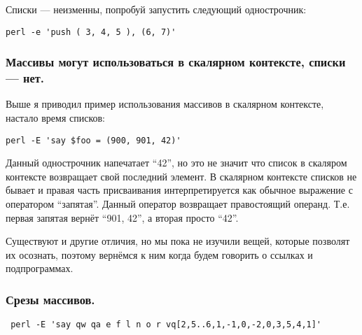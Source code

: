 Списки --- неизменны, попробуй запустить следующий однострочник:
\begin{verbatim}
perl -e 'push ( 3, 4, 5 ), (6, 7)'
\end{verbatim}

\subsubsection*{Массивы могут использоваться в скалярном контексте, списки --- нет.}
Выше я приводил пример использования массивов в скалярном контексте, настало время списков:
\begin{verbatim}
perl -E 'say $foo = (900, 901, 42)'
\end{verbatim}
Данный однострочник напечатает ``42'', но это не значит что список в скаляром контексте возвращает свой
последний элемент. В скалярном контексте списков не бывает и правая часть присваивания интерпретируется
как обычное выражение с оператором ``запятая''.
Данный оператор возвращает правостоящий операнд. Т.е. первая запятая вернёт ``901, 42'', а вторая
просто ``42''.

Существуют и другие отличия, но мы пока не изучили вещей, которые позволят их осознать, поэтому вернёмся к ним когда будем говорить о ссылках и подпрограммах.

\subsubsection{Срезы массивов.}
\begin{verbatim}
 perl -E 'say qw qa e f l n o r vq[2,5..6,1,-1,0,-2,0,3,5,4,1]'
\end{verbatim}
